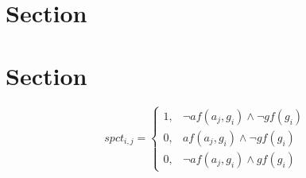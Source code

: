 \documentclass[a4paper]{article}
\begin{document}
\section{Section}

\section{Section}

\begin{equation}
spct_{i,j} =
\begin{cases}
1, & \text{$\neg af(a_j,g_i) \wedge \neg gf(g_i)$}\\
0, & \text{$af(a_j,g_i) \wedge \neg gf(g_i)$}\\
0, & \text{$\neg af(a_j,g_i) \wedge gf(g_i)$}
\end{cases}
\end{equation}
\end{document}
